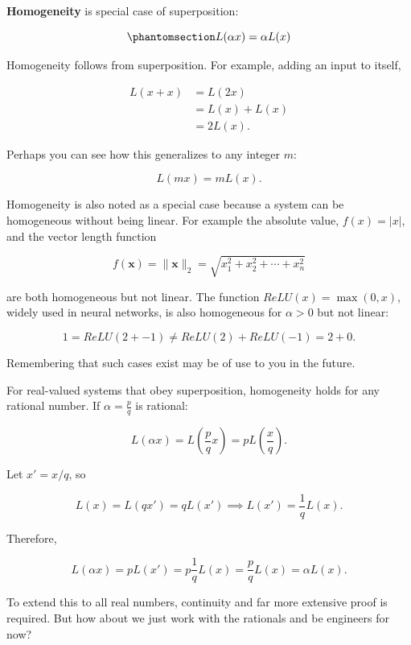 \documentclass[
  letterpaper,
]{book}
\begin{document}
\textbf{Homogeneity} is special case of superposition:

\begin{equation}\phantomsection\label{eq-homogeneity}{
L(\alpha x) = \alpha L(x)
}\end{equation}

Homogeneity follows from superposition. For example, adding an input to
itself,

\[\begin{aligned}
L(x + x) &= L(2x) \nonumber  \\ 
&= L(x) + L(x) \nonumber \\
&= 2L(x) . \nonumber
\end{aligned}
\]

Perhaps you can see how this generalizes to any integer \(m\):

\[
L(m x) = m L(x).
\]

Homogeneity is also noted as a special case because a system can be
homogeneous without being linear. For example the absolute value,
\(f(x) = |x|\), and the vector length function

\[
f(\mathbf{x}) = \|\mathbf{x}\|_2 = \sqrt{x_1^2 + x_2^2 + \cdots + x_n^2}
\]

are both homogeneous but not linear. The function
\(ReLU(x) = \max(0, x)\), widely used in neural networks, is also
homogeneous for \(\alpha > 0\) but not linear:

\[
1 = ReLU(2 + -1) \neq ReLU(2) + ReLU(-1) = 2 + 0.
\]

Remembering that such cases exist may be of use to you in the future.

\begin{tcolorbox}[enhanced jigsaw, title=\textcolor{quarto-callout-note-color}{\faInfo}\hspace{0.5em}{Extension to Rational Numbers}, colback=white, colframe=quarto-callout-note-color-frame, leftrule=.75mm, breakable, arc=.35mm, toptitle=1mm, left=2mm, colbacktitle=quarto-callout-note-color!10!white, toprule=.15mm, bottomrule=.15mm, coltitle=black, bottomtitle=1mm, titlerule=0mm, rightrule=.15mm, opacitybacktitle=0.6, opacityback=0]

For real-valued systems that obey superposition, homogeneity holds for
any rational number. If \(\alpha = \frac{p}{q}\) is rational:

\[
L(\alpha x) = L\left(\frac{p}{q}x\right) = p L\left(\frac{x}{q}\right).
\]

Let \(x' = x/q\), so

\[
L(x) = L(q x') = q L(x') \implies L(x') = \frac{1}{q} L(x).
\]

Therefore,

\[
L(\alpha x) = p L(x') = p \frac{1}{q} L(x) = \frac{p}{q} L(x) = \alpha L(x).
\]

To extend this to all real numbers, continuity and far more extensive
proof is required. But how about we just work with the rationals and be
engineers for now?

\end{tcolorbox}
\end{document}

